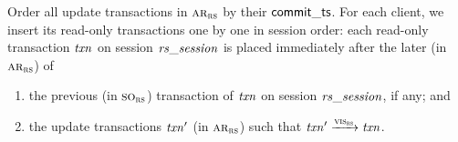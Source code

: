 \begin{frame}{}
  \begin{definition}
	Order all update transactions in $\textsc{ar}_{\textsc{rs}}$ by their ${\sf commit\_ts}$.
    For each client, we insert its read-only transactions
    one by one in session order:
    each read-only transaction $\mathit{txn}$
    on session $\mathit{rs\_session}$ is placed immediately
    after the later (in $\textsc{ar}_{\textsc{rs}}$) of
    \begin{enumerate}[(1)]
      \item the previous (in $\textsc{so}_{\textsc{rs}}$) transaction of $\mathit{txn}$
        on session $\mathit{rs\_session}$, if any; and
      \item the update transactions $\mathit{txn}'$ (in $\textsc{ar}_{\textsc{rs}}$)
        such that $\mathit{txn}' \xrightarrow{\textsc{vis}_{\textsc{rs}}} \mathit{txn}$.
    \end{enumerate}
  \end{definition}
\end{frame}

\begin{frame}{}
\end{frame}
